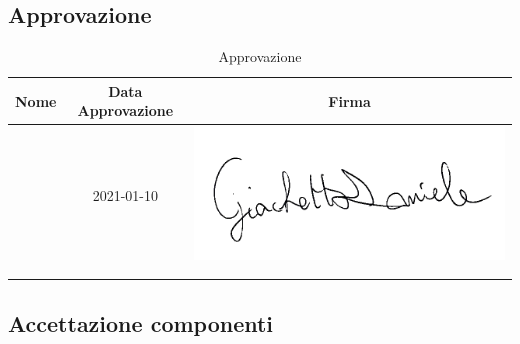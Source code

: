 \subsection{Approvazione}

\renewcommand{\arraystretch}{1}
	\begin{table}[H]
		\begin{center}
			\setlength{\aboverulesep}{0pt}
			\setlength{\belowrulesep}{0pt}
			\setlength{\extrarowheight}{.75ex}
			\begin{tabular}{ c c c}
				\rowcolor{AzzurroGruppo!30} 
				\textbf{Nome} & \textbf{Data Approvazione} & \textbf{Firma} \\
				\toprule
				
				\Daniele{} & 2021-01-10 & \includegraphics[scale = 0.16]{components/img/firme_membri/firma-dg.png} \\
				\Tullio{} & & \\
				\Riccardo{} & & \\
				
				\bottomrule
			\end{tabular}
			\caption{Approvazione}
		\end{center}
    \end{table}

\subsection{Accettazione componenti}

